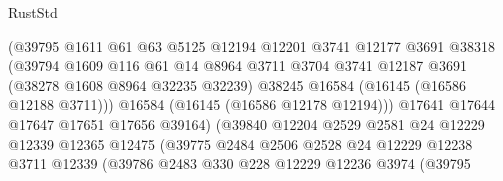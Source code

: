 \begin{lexlean}{RustStd}
\begin{coremodule}
                                  (@39795
                                    @1611
                                    @61
                                    @63
                                    @5125
                                    @12194
                                    @12201
                                    @3741
                                    @12177
                                    @3691
                                    @38318
                                    (@39794
                                      @1609
                                      @116
                                      @61
                                      @14
                                      @8964
                                      @3711
                                      @3704
                                      @3741
                                      @12187
                                      @3691
                                      (@38278 @1608 @8964 @32235 @32239)
                                      @38245
                                      @16584
                                      (@16145 (@16586 @12188 @3711)))
                                    @16584
                                    (@16145 (@16586 @12178 @12194)))
                                  @17641
                                  @17644
                                  @17647
                                  @17651
                                  @17656
                                  @39164)
                                (@39840
                                  @12204
                                  @2529
                                  @2581
                                  @24
                                  @12229
                                  @12339
                                  @12365
                                  @12475
                                  (@39775
                                    @2484
                                    @2506
                                    @2528
                                    @24
                                    @12229
                                    @12238
                                    @3711
                                    @12339
                                    (@39786
                                      @2483
                                      @330
                                      @228
                                      @12229
                                      @12236
                                      @3974
                                      (@39795

\end{coremodule}
\end{lexlean}
